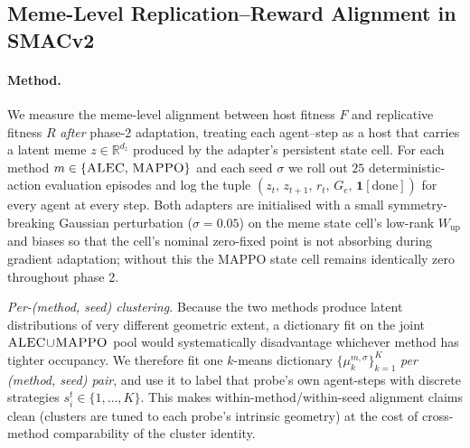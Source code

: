 
\subsection{Meme-Level Replication--Reward Alignment in SMACv2}
\label{sec:rale-smacv2}

\paragraph{Method.}
We measure the meme-level alignment between host fitness $F$ and replicative
fitness $R$ \emph{after} phase-2 adaptation, treating each agent--step as a
host that carries a latent meme $z\in\mathbb{R}^{d_z}$ produced by the
adapter's persistent state cell. For each method
$m\in\{\textsc{ALEC},\,\textsc{MAPPO}\}$ and each seed $\sigma$ we roll out
$25$ deterministic-action evaluation episodes and log the tuple
$(z_t,\,z_{t+1},\,r_t,\,G_e,\,\mathbf{1}[\text{done}])$ for every agent at
every step. Both adapters are initialised with a small symmetry-breaking
Gaussian perturbation ($\sigma\!=\!0.05$) on the meme state cell's low-rank
$W_{\mathrm{up}}$ and biases so that the cell's nominal zero-fixed point is
not absorbing during gradient adaptation; without this the MAPPO state cell
remains identically zero throughout phase 2.

\emph{Per-(method, seed) clustering.} Because the two methods produce latent
distributions of very different geometric extent, a dictionary fit on the
joint $\textsc{ALEC}\!\cup\!\textsc{MAPPO}$ pool would systematically
disadvantage whichever method has tighter occupancy. We therefore fit one
$k$-means dictionary $\{\mu_k^{m,\sigma}\}_{k=1}^{K}$ \emph{per (method,
seed) pair}, and use it to label that probe's own agent-steps with discrete
strategies $s_i^t\in\{1,\dots,K\}$. This makes within-method/within-seed
alignment claims clean (clusters are tuned to each probe's intrinsic
geometry) at the cost of cross-method comparability of the cluster identity.

